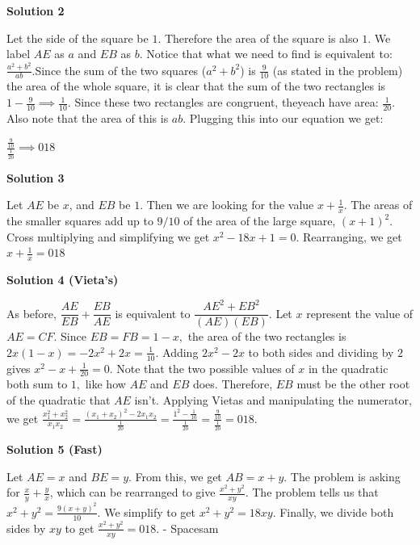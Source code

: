 \begin{enumerate}
 



\textbf{Solution 2}

Let the side of the square be $1$.  Therefore the area of the square is also $1$.   We label $AE$ as $a$ and $EB$ as $b$.  Notice that what we need to find is equivalent to: $\frac{a^2+b^2}{ab}$.Since the sum of the two squares ($a^2+b^2$) is $\frac{9}{10}$ (as stated in the problem) the area of the whole square, it is clear that the sum of the two rectangles is $1-\frac{9}{10} \implies \frac{1}{10}$.  Since these two rectangles are congruent, theyeach have area:  $\frac{1}{20}$.  Also note that the area of this is $ab$.  Plugging this into our equation we get:

 $\frac{\frac{9}{10}}{\frac{1}{20}} \implies \boxed{018}$




\textbf{Solution 3}

Let $AE$ be $x$, and $EB$ be $1$. Then we are looking for the value $x+\frac{1}{x}$. The areas of the smaller squares add up to $9/10$ of the area of the large square, $(x+1)^2$. Cross multiplying and simplifying we get $x^2-18x+1=0$. Rearranging, we get $x+\frac{1}{x}=\boxed{018}$




\textbf{Solution 4 (Vieta's)}

As before, $\dfrac{AE}{EB} + \dfrac{EB}{AE}$ is equivalent to $\dfrac{AE^2 + EB^2}{(AE)(EB)}$. Let $x$ represent the value of $AE=CF$. Since $EB=FB=1-x,$ the area of the two rectangles is $2x(1-x)=-2x^2+2x=\frac1{10}$. Adding $2x^2-2x$ to both sides and dividing by $2$ gives $x^2-x+\frac1{20}=0.$ Note that the two possible values of $x$ in the quadratic both sum to $1,$ like how $AE$ and $EB$ does. Therefore, $EB$ must be the other root of the quadratic that $AE$ isn't. Applying Vietas and manipulating the numerator, we get $\frac{x_1^2+x_2^2}{x_1x_2}=\frac{(x_1+x_2)^2-2x_1x_2}{\frac{1}{20}}=\frac{1^2-\frac1{10}}{\frac1{20}}=\frac{\frac9{10}}{\frac{1}{20}}=\boxed{018}$.

 



\textbf{Solution 5 (Fast)}

Let $AE = x$ and $BE = y$. From this, we get $AB = x + y$. The problem is asking for $\frac{x}{y} + \frac{y}{x}$, which can be rearranged to give $\frac{x^2 + y^2}{xy}$. The problem tells us that $x^2 + y^2 = \frac{9(x+y)^2}{10}$. We simplify to get $x^2 + y^2 = 18xy$. Finally, we divide both sides by $xy$ to get $\frac{x^2 + y^2}{xy} = \boxed{018}$. - Spacesam


\end{enumerate}
